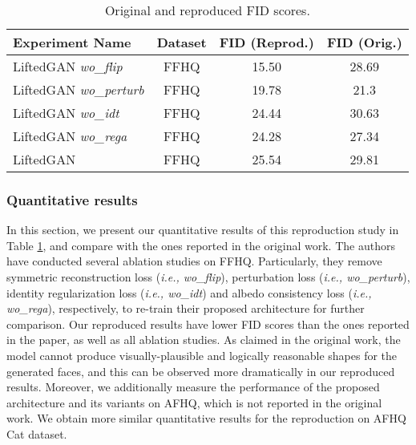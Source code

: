 \begin{table}[b!]
\centering
\caption{Original and reproduced FID scores.}
\begin{tabular}{|l|c|c|c|}
\hline
\textbf{Experiment Name} & \multicolumn{1}{l|}{\textbf{Dataset}} & \multicolumn{1}{l|}{\textbf{FID (Reprod.)}} & \multicolumn{1}{l|}{\textbf{FID (Orig.)}} \\ \hline
LiftedGAN \textit{wo\_flip}        & FFHQ                                  & 15.50                             & 28.69                                    \\ \hline
LiftedGAN \textit{wo\_perturb}     & FFHQ                                  & 19.78                             & 21.3                                    \\ \hline
LiftedGAN \textit{wo\_idt}         & FFHQ                                  & 24.44                             & 30.63                                 \\ \hline
LiftedGAN \textit{wo\_rega}        & FFHQ                                  & 24.28                              & 27.34                               \\ \hline
LiftedGAN                 & FFHQ                                  & 25.54                             & 29.81                                  \\ \hline
\end{tabular}
\label{tab:fid}
\end{table}

\subsubsection{Quantitative results}

In this section, we present our quantitative results of this reproduction study in Table \ref{tab:fid}, and compare with the ones reported in the original work. The authors have conducted several ablation studies on FFHQ. Particularly, they remove symmetric reconstruction loss (\textit{i.e., wo\_flip}), perturbation loss (\textit{i.e., wo\_perturb}), identity regularization loss (\textit{i.e., wo\_idt}) and albedo consistency loss (\textit{i.e., wo\_rega}), respectively, to re-train their proposed architecture for further comparison. Our reproduced results have lower FID scores than the ones reported in the paper, as well as all ablation studies. As claimed in the original work, the model cannot produce visually-plausible and logically reasonable shapes for the generated faces, and this can be observed more dramatically in our reproduced results. Moreover, we additionally measure the performance of the proposed architecture and its variants on AFHQ, which is not reported in the original work. We obtain more similar quantitative results for the reproduction on AFHQ Cat dataset.

